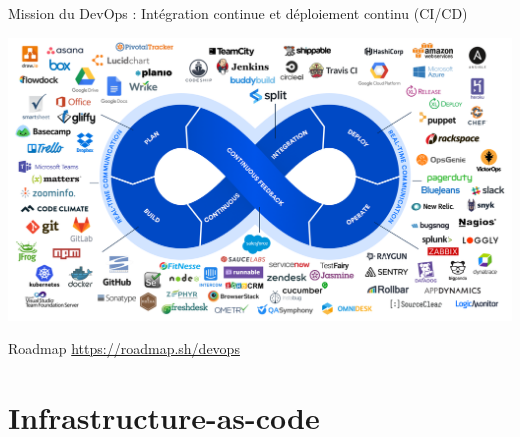 \documentclass[aspectratio=169,10pt]{beamer}
\begin{document}
\begin{frame}{Mission du DevOps : Intégration continue et déploiement continu (CI/CD)}

\centering
\includegraphics[scale=0.69]{images/devopstool.png}

\end{frame}


\begin{frame}{Roadmap}
\centering
\large
\url{https://roadmap.sh/devops} 
 
\end{frame}


\section{Infrastructure-as-code}

\end{document}
